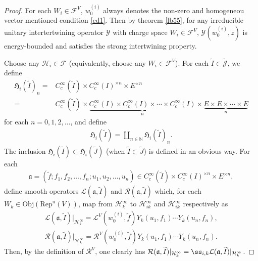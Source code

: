 \documentclass[12pt,a4paper]{article}
\theoremstyle{definition}
\theoremstyle{plain}
\newcommand{\fk}{\mathfrak}
\newcommand{\mc}{\mathcal}
\newcommand{\wtd}{\widetilde}
\newcommand{\Jtd}{\widetilde{\mathcal J}}
\newcommand{\RepuV}{\mathrm{Rep}^{\mathrm u}(V)}
\newcommand{\mbb}{\mathbb}
\newcommand{\Obj}{\mathrm{Obj}}
\numberwithin{equation}{subsection}
\begin{document}
\begin{proof}
For each $W_i\in\mc F^V$, $w^{(i)}_0$ always denotes the non-zero and homogeneou vector mentioned condition \ref{cd1}. Then by theorem \ref{lb55}, for any irreducible unitary intertertwining operator $\mc Y$ with charge space $W_i\in\mc F^V$, $\mc Y(w^{(i)}_0,z)$ is energy-bounded and satisfies the strong intertwining property. 

Choose any $\mc H_i\in\mc F$ (equivalently, choose any $W_i\in\mc F^V$). For each $\wtd I\in\Jtd$, we define
\begin{align}
\fk H_i(\wtd I)_n=&C_c^\infty(\wtd I)\times C_c^\infty(I)^{\times n}\times E^{\times n}\nonumber\\
=&C_c^\infty(\wtd I)\times\underbrace{C_c^\infty(I)\times C_c^\infty(I)\times\cdots\times C_c^\infty(I)}_{n}\times\underbrace{E\times E\times\cdots\times E}_{n} 
\end{align}
for each $n=0,1,2,\dots$, and define 
\begin{align}
\fk H_i(\wtd I)=\coprod_{n\in\mbb N}\fk H_i(\wtd I)_n.
\end{align}
The inclusion $\fk H_i(\wtd I)\subset \fk H_i(\wtd J)$ (when $\wtd I\subset\wtd J$) is defined in an obvious way. For each
\begin{align*}
\fk a=(\wtd f;f_1,f_2,\dots,f_n;u_1,u_2,\dots,u_n)\in C_c^\infty(\wtd I)\times C_c^\infty(I)^{\times n}\times E ^{\times n},
\end{align*}
define smooth operators $\mc L(\fk a,\wtd I)$ and $\mc R(\fk a,\wtd I)$ which, for each $W_k\in\Obj(\RepuV)$, map from $\mc H_k^\infty$ to $\mc H_{ik}^\infty$ and $\mc H_{ik}^\infty$ respectively as
\begin{gather}
\mc L(\fk a,\wtd I)|_{\mc H_k^\infty}=\mc L^V(w^{(i)}_0,\wtd f)Y_k(u_1,f_1)\cdots Y_k(u_n,f_n),\label{eq40}\\
\mc R(\fk a,\wtd I)|_{\mc H_k^\infty}=\mc R^V(w^{(i)}_0,\wtd f)Y_k(u_1, f_1)\cdots Y_k(u_n,f_n).\label{eq41}
\end{gather}
Then, by the definition of $\mc R^V$, one clearly has $\mc R(\fk a,\wtd I)|_{\mc H_k^\infty}=\ss_{i,k}\mc L(\fk a,\wtd I)|_{\mc H_k^\infty}$. 


\end{proof}
\end{document}
